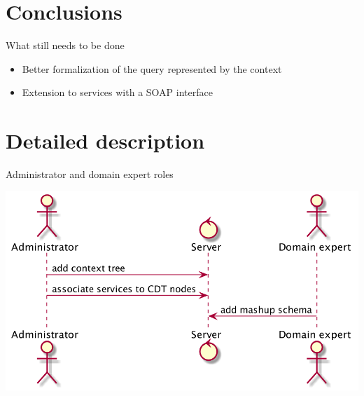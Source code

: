 \documentclass[smaller]{beamer}
\begin{document}
\section{Conclusions}
\label{sec:orgheadline30}
\begin{frame}[label={sec:orgheadline29}]{What still needs to be done}
\begin{itemize}
\item Better formalization of the query represented by the context

\item Extension to services with a SOAP interface
\end{itemize}
\end{frame}


\section{Detailed description}
\label{sec:orgheadline32}
\begin{frame}[label={sec:orgheadline31}]{Administrator and domain expert roles}
\begin{center}
\includegraphics{images/designtime.png}
\end{center}
\end{frame}
\end{document}
